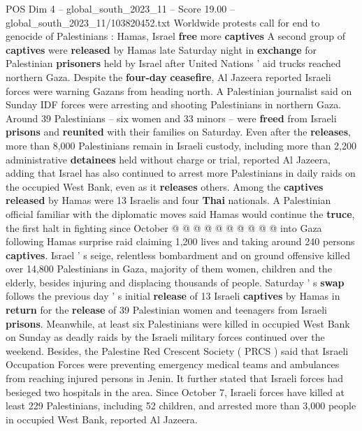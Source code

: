 \begin{textsample}{POS Dim 4 – global\_south\_2023\_11 – Score 19.00 – global\_south\_2023\_11/103820452.txt}  \label{ex:f4_pos_158}
Worldwide protests call for end to genocide of Palestinians : Hamas, Israel \textbf{free} more \textbf{captives} A second group of \textbf{captives} were \textbf{released} by Hamas late Saturday night in \textbf{exchange} for Palestinian \textbf{prisoners} held by Israel after United Nations ' aid trucks reached northern Gaza.
Despite the \textbf{four-day} \textbf{ceasefire}, Al Jazeera reported Israeli forces were warning Gazans from heading north.
A Palestinian journalist said on Sunday IDF forces were arresting and shooting Palestinians in northern Gaza.
Around 39 Palestinians -- six women and 33 minors -- were \textbf{freed} from Israeli \textbf{prisons} and \textbf{reunited} with their families on Saturday.
Even after the \textbf{releases}, more than 8,000 Palestinians remain in Israeli custody, including more than 2,200 administrative \textbf{detainees} held without charge or trial, reported Al Jazeera, adding that Israel has also continued to arrest more Palestinians in daily raids on the occupied West Bank, even as it \textbf{releases} others.
Among the \textbf{captives} \textbf{released} by Hamas were 13 Israelis and four \textbf{Thai} nationals.
A Palestinian official familiar with the diplomatic moves said Hamas would continue the \textbf{truce}, the first halt in fighting since October @ @ @ @ @ @ @ @ @ @ into Gaza following Hamas surprise raid claiming 1,200 lives and taking around 240 persons \textbf{captives}.
Israel ' s seige, relentless bombardment and on ground offensive killed over 14,800 Palestinians in Gaza, majority of them women, children and the elderly, besides injuring and displacing thousands of people.
Saturday ' s \textbf{swap} follows the previous day ' s initial \textbf{release} of 13 Israeli \textbf{captives} by Hamas in \textbf{return} for the \textbf{release} of 39 Palestinian women and teenagers from Israeli \textbf{prisons}.
Meanwhile, at least six Palestinians were killed in occupied West Bank on Sunday as deadly raids by the Israeli military forces continued over the weekend.
Besides, the Palestine Red Crescent Society ( PRCS ) said that Israeli Occupation Forces were preventing emergency medical teams and ambulances from reaching injured persons in Jenin.
It further stated that Israeli forces had besieged two hospitals in the area.
Since October 7, Israeli forces have killed at least 229 Palestinians, including 52 children, and arrested more than 3,000 people in occupied West Bank, reported Al Jazeera.

\end{textsample}
